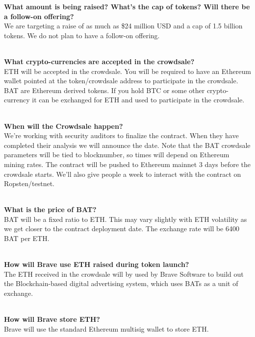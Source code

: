\documentclass[11pt]{article}
\begin{document}
\vbox{\textbf{What amount is being raised? What’s the cap of tokens? Will there be a follow-on offering?}\\
We are targeting a raise of as much as \$24 million USD and a cap of 1.5 billion tokens. We do not plan to have a follow-on offering. \\
\\
}

\vbox{\textbf{What crypto-currencies are accepted in the crowdsale?}\\
ETH will be accepted in the crowdsale. You will be required to have an Ethereum wallet pointed at the token/crowdsale address to participate in the crowdsale. \textrm{BAT} are Ethereum derived tokens. If you hold BTC or some other crypto-currency it can be exchanged for ETH and used to participate in the crowdsale.\\
\\
}

\vbox{\textbf{When will the Crowdsale happen?}\\
We're working with security auditors to finalize the contract. When they have completed their analysis we will announce the date. Note that the \textrm{BAT} crowdsale parameters will be tied to blocknumber, so times will depend on Ethereum mining rates. The contract will be pushed to Ethereum mainnet 3 days before the crowdsale starts. We'll also give people a week to interact with the contract on Ropsten/testnet.\\
\\
}

\vbox{\textbf{What is the price of BAT?}\\
BAT will be a fixed ratio to ETH. This may vary slightly with ETH volatility as we get closer to the contract deployment date. The exchange rate will be 6400 \textrm{BAT} per ETH.\\
\\
}

\vbox{\textbf{How will Brave use ETH raised during token launch? }\\
The ETH received in the crowdsale will by used by Brave Software to build out the Blockchain-based digital advertising system, which uses \textrm{BAT}s as a unit of exchange. \\ 
\\
}

\vbox{\textbf{How will Brave store ETH? }\\
Brave will use the standard Ethereum multisig wallet to store ETH. \\
\\
}
\end{document}
